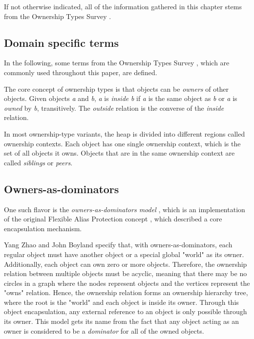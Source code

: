 \documentclass[sigplan,11pt,nonacm]{acmart}
\begin{document}
If not otherwise indicated, all of the information gathered in this chapter stems from the Ownership Types Survey \cite{ownership-types-survey}.


\subsection{Domain specific terms}
\label{sec:domain-specific-terms}

In the following, some terms from the Ownership Types Survey \cite{ownership-types-survey}, which are commonly used throughout this paper, are defined.

The core concept of ownership types is that objects can be \emph{owners} of other objects.
Given objects \emph{a} and \emph{b}, \emph{a} is \emph{inside} \emph{b} if \emph{a} is the same object as \emph{b} or \emph{a} is \emph{owned} by \emph{b}, transitively.
The \emph{outside} relation is the converse of the \emph{inside} relation.

In most ownership-type variants, the heap is divided into different regions called ownership contexts.
Each object has one single ownership context, which is the set of all objects it owns.
Objects that are in the same ownership context are called \emph{siblings} or \emph{peers}.


\subsection{Owners-as-dominators}
\label{sec:owners-as-dominators}

One such flavor is the \emph{owners-as-dominators model} \cite{ownership-types-survey}, which is an implementation of the original Flexible Alias Protection concept \cite{flexible-alias-protection}, which described a core encapsulation mechanism.

Yang Zhao and John Boyland \cite{permission-ownership-types} specify that, with owners-as-dominators, each regular object must have another object or a special global "world" as its owner.
Additionally, each object can own zero or more objects.
Therefore, the ownership relation between multiple objects must be acyclic, meaning that there may be no circles in a graph where the nodes represent objects and the vertices represent the "owns" relation.
Hence, the ownership relation forms an ownership hierarchy tree, where the root is the "world" and each object is inside its owner.
Through this object encapsulation, any external reference to an object is only possible through its owner.
This model gets its name from the fact that any object acting as an owner is considered to be a \emph{dominator} for all of the owned objects.
\end{document}
